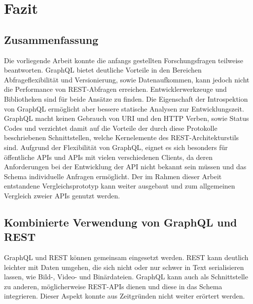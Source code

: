 \chapter{Fazit}

\section{Zusammenfassung}
Die vorliegende Arbeit konnte die anfangs gestellten Forschungsfragen teilweise beantworten.
GraphQL bietet deutliche Vorteile in den Bereichen Abfrageflexibilität und Versionierung, sowie Datenaufkommen, kann jedoch nicht die Performance von REST-Abfragen erreichen.
Entwicklerwerkzeuge und Bibliotheken sind für beide Ansätze zu finden.
Die Eigenschaft der Introspektion von GraphQL ermöglicht aber bessere statische Analysen zur Entwicklungszeit.
GraphQL macht keinen Gebrauch von URI und den HTTP Verben, sowie Status Codes und verzichtet damit auf die Vorteile der durch diese Protokolle beschriebenen Schnittstellen, welche Kernelemente des REST-Architekturstils sind.
Aufgrund der Flexibilität von GraphQL, eignet es sich besonders für öffentliche APIs und APIs mit vielen verschiedenen Clients, da deren Anforderungen bei der Entwicklung der API nicht bekannt sein müssen und das Schema individuelle Anfragen ermöglicht.
Der im Rahmen dieser Arbeit entstandene Vergleichsprototyp kann weiter ausgebaut und zum allgemeinen Vergleich zweier APIs genutzt werden.
\section{Kombinierte Verwendung von GraphQL und REST}
GraphQL und REST können gemeinsam eingesetzt werden.
REST kann deutlich leichter mit Daten umgehen, die sich nicht oder nur schwer in Text serialisieren lassen, wie Bild-, Video- und Binärdateien.
GraphQL kann auch als Schnittstelle zu anderen, möglicherweise REST-APIs dienen und diese in das Schema integrieren.
Dieser Aspekt konnte aus Zeitgründen nicht weiter erörtert werden.
